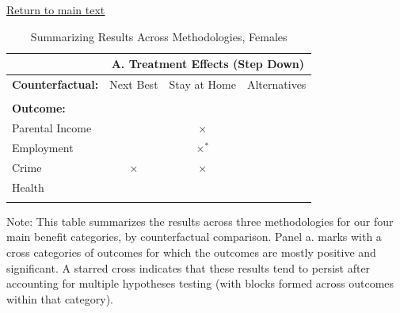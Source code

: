 \documentclass[static]{JJH-Beamer}
\begin{document}
\begin{frame}
 \addtocounter{framenumber}{-1}

\begin{center}
\hyperlink{ret:sense}{\underline{Return to main text}}
\end{center}

\end{frame}

\begin{frame}
 \addtocounter{framenumber}{-1}
\hypertarget{across}{}

\begin{table}[H]
\caption{Summarizing Results Across Methodologies, Females}
\begin{center}
\begin{tabular}{lccc}
\toprule
& \multicolumn{3}{c}{\textbf{A. Treatment Effects (Step Down)}} \\
\midrule
\textbf{Counterfactual:} & Next Best & Stay at Home & Alternatives \\ \\
\textbf{Outcome:} & \\
Parental Income & & $\times$  \\
Employment & & $\times^*$  \\
Crime & $\times$ & $\times$  \\
Health  \\ \\
\bottomrule
\end{tabular}
\end{center}
\tiny\flushleft Note: This table summarizes the results across three methodologies for our four main benefit categories, by counterfactual comparison. Panel a. marks with a cross categories of outcomes for which the outcomes are mostly positive and significant. A starred cross indicates that these results tend to persist after accounting for multiple hypotheses testing (with blocks formed across outcomes within that category).\\
\end{table}

\end{frame}
\end{document}
